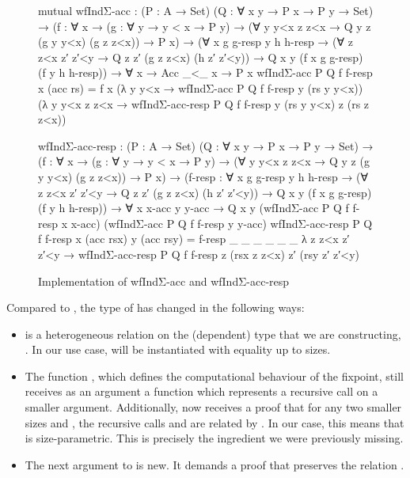\begin{figure}
  \centering
\begin{code}
mutual
  wfIndΣ-acc : (P : A → Set) (Q : ∀ x y → P x → P y → Set)
    → (f : ∀ x
        → (g : ∀ y → y < x → P y)
        → (∀ y y<x z z<x → Q y z (g y y<x) (g z z<x))
        → P x)
    → (∀ x g g-resp y h h-resp
        → (∀ z z<x z′ z′<y → Q z z′ (g z z<x) (h z′ z′<y))
        → Q x y (f x g g-resp) (f y h h-resp))
    → ∀ x → Acc _<_ x → P x
  wfIndΣ-acc P Q f f-resp x (acc rs)
    = f x
      (λ y y<x → wfIndΣ-acc P Q f f-resp y (rs y y<x))
      (λ y y<x z z<x
          → wfIndΣ-acc-resp P Q f f-resp y (rs y y<x) z (rs z z<x))

  wfIndΣ-acc-resp : (P : A → Set) (Q : ∀ x y → P x → P y → Set)
    → (f : ∀ x
        → (g : ∀ y → y < x → P y)
        → (∀ y y<x z z<x → Q y z (g y y<x) (g z z<x))
        → P x)
    → (f-resp : ∀ x g g-resp y h h-resp
        → (∀ z z<x z′ z′<y → Q z z′ (g z z<x) (h z′ z′<y))
        → Q x y (f x g g-resp) (f y h h-resp))
    → ∀ x x-acc y y-acc
    → Q x y
        (wfIndΣ-acc P Q f f-resp x x-acc)
        (wfIndΣ-acc P Q f f-resp y y-acc)
  wfIndΣ-acc-resp P Q f f-resp x (acc rsx) y (acc rsy)
    = f-resp _ _ _ _ _ _ λ z z<x z′ z′<y
        → wfIndΣ-acc-resp P Q f f-resp z (rsx z z<x) z′ (rsy z′ z′<y)
\end{code}

  \caption{Implementation of wfIndΣ-acc and wfIndΣ-acc-resp}
  \label{fig:wfIndΣ}
\end{figure}

Compared to , the type of  has changed in the
following ways:
\begin{itemize}
  \item {} is a heterogeneous relation on the (dependent) type that we
    are constructing, . In our use case,  will be instantiated
    with equality up to sizes.
  \item The function , which defines the computational behaviour of the
    fixpoint, still receives as an argument a function  which
    represents a recursive call on a smaller argument. Additionally, 
    now receives a proof that for any two smaller sizes  and ,
    the recursive calls  and  are related by . In
    our case, this means that  is size-parametric. This is precisely
    the ingredient we were previously missing.
  \item The next argument to  is new. It demands a proof that
     preserves the relation .
\end{itemize}

